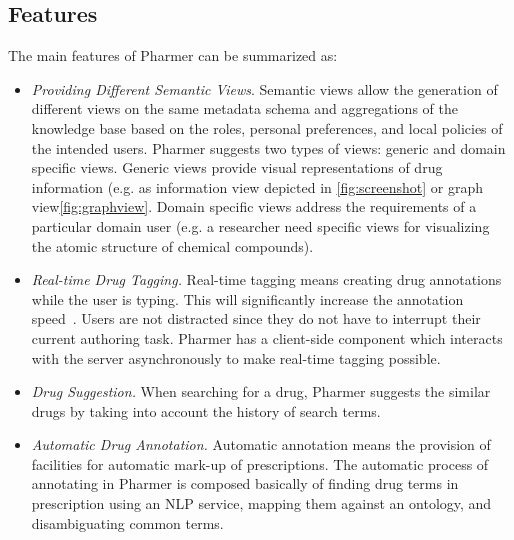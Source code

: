 \documentclass[conference]{IEEEtran}
\begin{document}
\subsection{Features}
The main features of Pharmer can be summarized as:
\begin{itemize}
	\item \emph{Providing Different Semantic Views}.
	Semantic views allow the generation of different views on the same metadata schema and aggregations of the knowledge base based on the roles, personal preferences, and local policies of the intended users.
	Pharmer suggests two types of views: generic and domain specific views.
	Generic views provide visual representations of drug information (e.g. as information view depicted in \autoref{fig:screenshot} or graph view\autoref{fig:graphview}.
	Domain specific views address the requirements of a particular domain user (e.g. a researcher need specific views for visualizing the atomic structure of chemical compounds).
	\item \emph{Real-time Drug Tagging.}
	Real-time tagging means creating drug annotations while the user is typing.
	This will significantly increase the annotation speed~\cite{OCA}.
	Users are not distracted since they do not have to interrupt their current authoring task.
	Pharmer has a client-side component which interacts with the server asynchronously to make real-time tagging possible.
	\item \emph{Drug Suggestion.}
		When searching for a drug, Pharmer suggests the similar drugs by taking into account the history of search terms.
    \item \emph{Automatic Drug Annotation.}
    Automatic annotation means the provision of facilities for automatic mark-up of prescriptions.
    The automatic process of annotating in Pharmer is composed basically of finding drug terms in prescription using an NLP service, mapping them against an ontology, and disambiguating common terms.
\end{itemize}
\end{document}
